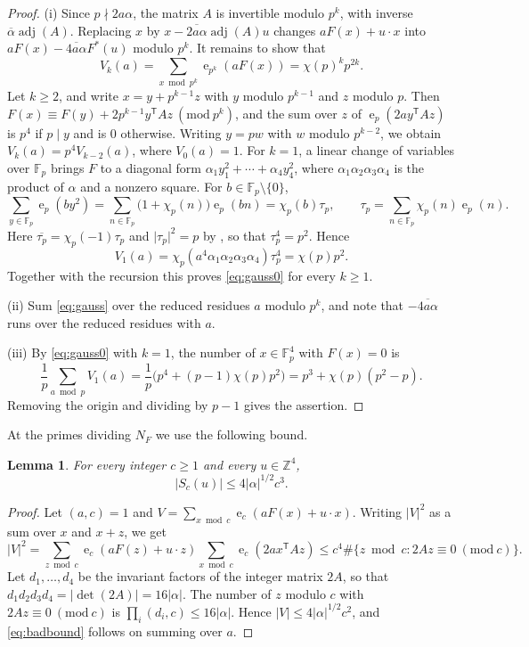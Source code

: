 \documentclass[11pt]{amsart}
\numberwithin{equation}{section}
\numberwithin{figure}{section}
\newtheorem{lemma}{Lemma}[section]
\theoremstyle{definition}
\newcommand{\Z}{\mathbb{Z}}
\newcommand{\e}{\operatorname{e}}
\newcommand{\imod}[1]{\ (\mathrm{mod}\ #1)}
\newcommand{\abs}[1]{\lvert #1\rvert}
\newcommand{\Fp}{\mathbb F_p}
\newcommand{\adj}{\operatorname{adj}}
\begin{document}
\begin{proof}
(i) Since $p\nmid2a\alpha$, the matrix $A$ is invertible modulo $p^k$,
with inverse $\overline\alpha\adj(A)$. Replacing $x$ by
$x-\overline{2a\alpha}\adj(A)u$ changes $aF(x)+u\cdot x$ into
$aF(x)-\overline{4a\alpha}F^*(u)$ modulo $p^k$. It remains to show
that
\begin{equation}\label{eq:gauss0}
 V_k(a)=\sum_{x\bmod p^k}\e_{p^k}(aF(x))=\chi(p)^kp^{2k}.
\end{equation}
Let $k\ge2$, and write $x=y+p^{k-1}z$ with $y$ modulo $p^{k-1}$ and
$z$ modulo $p$. Then
$F(x)\equiv F(y)+2p^{k-1}y^{\mathsf T}Az\imod{p^k}$, and the sum over
$z$ of $\e_p(2ay^{\mathsf T}Az)$ is $p^4$ if $p\mid y$ and is $0$
otherwise. Writing $y=pw$ with $w$ modulo $p^{k-2}$, we obtain
$V_k(a)=p^4V_{k-2}(a)$, where $V_0(a)=1$. For $k=1$, a linear change
of variables over $\Fp$ brings $F$ to a diagonal form
$\alpha_1y_1^2+\cdots+\alpha_4y_4^2$, where
$\alpha_1\alpha_2\alpha_3\alpha_4$ is the product of $\alpha$ and a
nonzero square. For $b\in\Fp\setminus\{0\}$,
\[
 \sum_{y\in\Fp}\e_p(by^2)=\sum_{n\in\Fp}\big(1+\chi_p(n)\big)\e_p(bn)
 =\chi_p(b)\tau_p,\qquad\tau_p=\sum_{n\in\Fp}\chi_p(n)\e_p(n).
\]
Here $\overline{\tau_p}=\chi_p(-1)\tau_p$ and $\abs{\tau_p}^2=p$ by
\cite[Theorems~9.5 and~9.7]{MV}, so that $\tau_p^4=p^2$. Hence
\[
 V_1(a)=\chi_p(a^4\alpha_1\alpha_2\alpha_3\alpha_4)\tau_p^4=\chi(p)p^2.
\]
Together with the recursion this proves \eqref{eq:gauss0} for every
$k\ge1$.

(ii) Sum \eqref{eq:gauss} over the reduced residues $a$ modulo $p^k$,
and note that $-\overline{4a\alpha}$ runs over the reduced residues
with $a$.

(iii) By \eqref{eq:gauss0} with $k=1$, the number of $x\in\Fp^4$ with
$F(x)=0$ is
\[
 \frac1p\sum_{a\bmod p}V_1(a)=\frac1p\big(p^4+(p-1)\chi(p)p^2\big)
 =p^3+\chi(p)(p^2-p).
\]
Removing the origin and dividing by $p-1$ gives the assertion.
\end{proof}

At the primes dividing $N_F$ we use the following bound.

\begin{lemma}\label{lem:badprime}
For every integer $c\ge1$ and every $u\in\Z^4$,
\begin{equation}\label{eq:badbound}
 \abs{S_c(u)}\le4\abs\alpha^{1/2}c^3.
\end{equation}
\end{lemma}

\begin{proof}
Let $(a,c)=1$ and
$V=\sum_{x\bmod c}\e_c(aF(x)+u\cdot x)$. Writing $\abs V^2$ as a sum
over $x$ and $x+z$, we get
\[
 \abs V^2=\sum_{z\bmod c}\e_c(aF(z)+u\cdot z)
 \sum_{x\bmod c}\e_c(2ax^{\mathsf T}Az)
 \le c^4\#\{z\bmod c:2Az\equiv0\imod c\}.
\]
Let $d_1,\ldots,d_4$ be the invariant factors of the integer matrix
$2A$, so that $d_1d_2d_3d_4=\abs{\det(2A)}=16\abs\alpha$. The number
of $z$ modulo $c$ with $2Az\equiv0\imod c$ is
$\prod_i(d_i,c)\le16\abs\alpha$. Hence $\abs V\le4\abs\alpha^{1/2}c^2$,
and \eqref{eq:badbound} follows on summing over $a$.
\end{proof}
\end{document}
